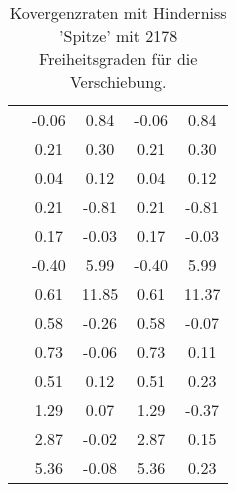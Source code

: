 \begin{table}
\begin{tabular}{c|cc|cc|}
\multicolumn{1}{|c|}{} & \multicolumn{1}{|c|}{     -0.06} & \multicolumn{1}{|c|}{      0.84} & \multicolumn{1}{|c|}{     -0.06} & \multicolumn{1}{|c|}{      0.84} \\ 
\multicolumn{1}{|c|}{} & \multicolumn{1}{|c|}{      0.21} & \multicolumn{1}{|c|}{      0.30} & \multicolumn{1}{|c|}{      0.21} & \multicolumn{1}{|c|}{      0.30} \\ 
\multicolumn{1}{|c|}{} & \multicolumn{1}{|c|}{      0.04} & \multicolumn{1}{|c|}{      0.12} & \multicolumn{1}{|c|}{      0.04} & \multicolumn{1}{|c|}{      0.12} \\ 
\multicolumn{1}{|c|}{} & \multicolumn{1}{|c|}{      0.21} & \multicolumn{1}{|c|}{     -0.81} & \multicolumn{1}{|c|}{      0.21} & \multicolumn{1}{|c|}{     -0.81} \\ 
\multicolumn{1}{|c|}{} & \multicolumn{1}{|c|}{      0.17} & \multicolumn{1}{|c|}{     -0.03} & \multicolumn{1}{|c|}{      0.17} & \multicolumn{1}{|c|}{     -0.03} \\ 
\multicolumn{1}{|c|}{} & \multicolumn{1}{|c|}{     -0.40} & \multicolumn{1}{|c|}{      5.99} & \multicolumn{1}{|c|}{     -0.40} & \multicolumn{1}{|c|}{      5.99} \\ 
\multicolumn{1}{|c|}{} & \multicolumn{1}{|c|}{      0.61} & \multicolumn{1}{|c|}{     11.85} & \multicolumn{1}{|c|}{      0.61} & \multicolumn{1}{|c|}{     11.37} \\ 
\multicolumn{1}{|c|}{} & \multicolumn{1}{|c|}{      0.58} & \multicolumn{1}{|c|}{     -0.26} & \multicolumn{1}{|c|}{      0.58} & \multicolumn{1}{|c|}{     -0.07} \\ 
\multicolumn{1}{|c|}{} & \multicolumn{1}{|c|}{      0.73} & \multicolumn{1}{|c|}{     -0.06} & \multicolumn{1}{|c|}{      0.73} & \multicolumn{1}{|c|}{      0.11} \\ 
\multicolumn{1}{|c|}{} & \multicolumn{1}{|c|}{      0.51} & \multicolumn{1}{|c|}{      0.12} & \multicolumn{1}{|c|}{      0.51} & \multicolumn{1}{|c|}{      0.23} \\ 
\multicolumn{1}{|c|}{} & \multicolumn{1}{|c|}{      1.29} & \multicolumn{1}{|c|}{      0.07} & \multicolumn{1}{|c|}{      1.29} & \multicolumn{1}{|c|}{     -0.37} \\ 
\multicolumn{1}{|c|}{} & \multicolumn{1}{|c|}{      2.87} & \multicolumn{1}{|c|}{     -0.02} & \multicolumn{1}{|c|}{      2.87} & \multicolumn{1}{|c|}{      0.15} \\ 
\multicolumn{1}{|c|}{} & \multicolumn{1}{|c|}{      5.36} & \multicolumn{1}{|c|}{     -0.08} & \multicolumn{1}{|c|}{      5.36} & \multicolumn{1}{|c|}{      0.23} \\ 
\hline 
\end{tabular}\caption{Kovergenzraten mit Hinderniss 'Spitze' mit 2178 Freiheitsgraden für die Verschiebung.}\label{tab:Rate_Spitze_level4}
\end{table} 

